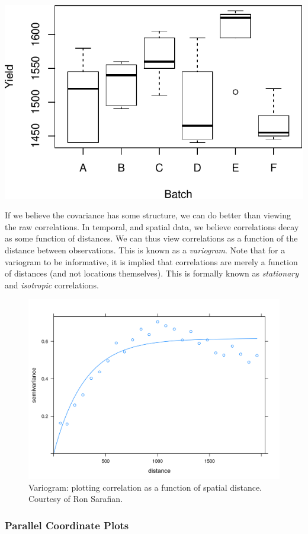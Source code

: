 \documentclass[]{book}
\theoremstyle{definition}
\theoremstyle{definition}
\theoremstyle{definition}
\theoremstyle{remark}
\begin{document}
\includegraphics[width=0.5\linewidth]{Rcourse_files/figure-latex/unnamed-chunk-142-1}

If we believe the covariance has some structure, we can do better than
viewing the raw correlations. In temporal, and spatial data, we believe
correlations decay as some function of distances. We can thus view
correlations as a function of the distance between observations. This is
known as a \emph{variogram}. Note that for a variogram to be
informative, it is implied that correlations are merely a function of
distances (and not locations themselves). This is formally known as
\emph{stationary} and \emph{isotropic} correlations.

\begin{figure}
\centering
\includegraphics{art/variogram.png}
\caption{Variogram: plotting correlation as a function of spatial
distance. Courtesy of Ron Sarafian.}
\end{figure}

\hypertarget{parcoord}{\subsubsection{Parallel Coordinate
Plots}\label{parcoord}}
\end{document}
